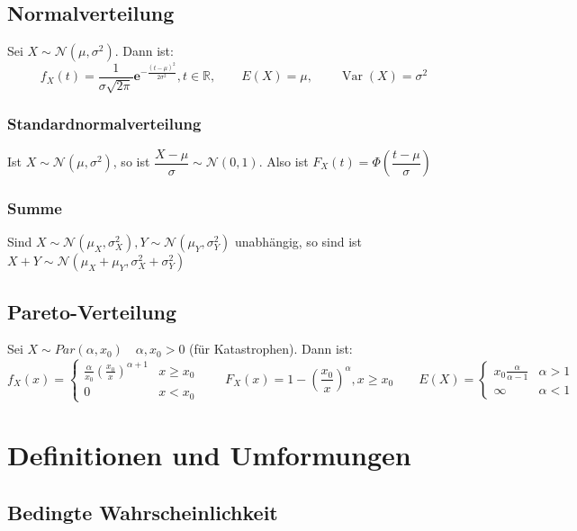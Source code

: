 \documentclass[a4paper,titlepage]{article}
\DeclareMathOperator{\Var}{Var}
\newcommand{\emath}{\boldsymbol{e}}
\begin{document}
\subsection{Normalverteilung}
Sei $X \sim \mathcal{N}(\mu, \sigma^2)$. Dann ist:
\begin{equation*}
f_X(t) = \frac{1}{\sigma\sqrt{2 \pi}}\emath^{-\frac{(t-\mu)^2}{2\sigma^2}}, t \in \mathbb{R}, \qquad E(X) = \mu, \qquad \Var(X) = \sigma^2
\end{equation*}
\subsubsection{Standardnormalverteilung}
Ist $X \sim \mathcal{N}(\mu, \sigma^2)$, so ist $\dfrac{X-\mu}{\sigma} \sim \mathcal{N}(0,1)$. Also ist $F_X(t) = \Phi\left(\dfrac{t-\mu}{\sigma}\right)$
\subsubsection{Summe}
Sind $X \sim \mathcal{N}(\mu_X, \sigma_X^2), Y \sim \mathcal{N}(\mu_Y, \sigma_Y^2)$ unabhängig, so sind ist $X + Y \sim \mathcal{N}(\mu_X+ \mu_Y, \sigma_X^2 + \sigma_Y^2)$

\subsection{Pareto-Verteilung}
Sei $X \sim Par(\alpha,x_0) \quad \alpha,x_0 > 0$ (für Katastrophen). Dann ist:
\begin{equation*}
f_X(x) = \begin{cases}
\frac{\alpha}{x_0}\left( \frac{x_0}{x}\right)^{\alpha+1} & x \geq x_0 \\
0 & x < x_0
\end{cases}
\qquad
F_X(x) = 1 - \left( \frac{x_0}{x}\right)^\alpha, x \geq x_0 
\qquad E(X) = \begin{cases}
x_0\frac{\alpha}{\alpha - 1} & \alpha > 1 \\
\infty 	& \alpha < 1
\end{cases}
\end{equation*}

\section{Definitionen und Umformungen}
\subsection{Bedingte Wahrscheinlichkeit}
\end{document}
